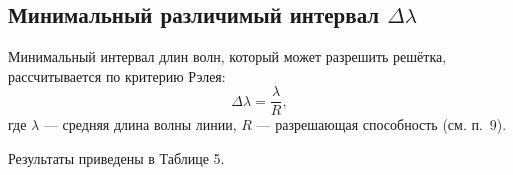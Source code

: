 \subsection{Минимальный различимый интервал \(\Delta\lambda\)}

Минимальный интервал длин волн, который может разрешить решётка, рассчитывается по критерию Рэлея:
\[
	\Delta\lambda = \frac{\lambda}{R},
\]
где \(\lambda\) — средняя длина волны линии, \(R\) — разрешающая способность (см. п.~9).

Результаты приведены в Таблице 5.
